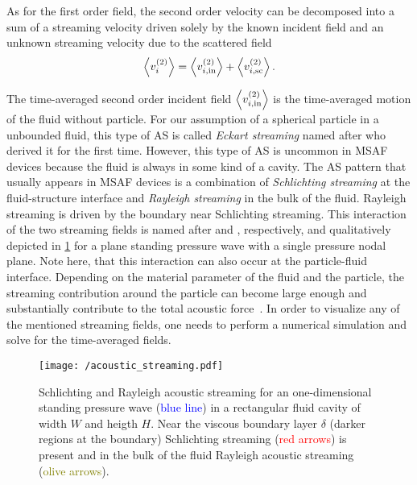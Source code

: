 As for the first order field, the second order velocity can be decomposed into 
a sum of a streaming velocity driven solely by the known incident field and an 
unknown streaming velocity due to the scattered field
\begin{equation}
  \left\langle v_{i}^{(2)} \right\rangle =
    \left\langle v_{i,\mathrm{in}}^{(2)} \right\rangle +
    \left\langle v_{i,\mathrm{sc}}^{(2)} \right\rangle.
  \label{eq:TA-nd-velocity}
\end{equation}

The time-averaged second order incident field 
$\left\langle v_{i,\mathrm{in}}^{(2)} \right\rangle$ is the time-averaged motion of the 
fluid without particle. For our assumption of a spherical particle in a 
unbounded fluid, this type of AS is called \emph{Eckart streaming} named after 
 who derived it for the first time. However, this type of AS 
is uncommon in MSAF devices because the fluid is always in some kind of a 
cavity. The AS pattern that usually appears in MSAF devices is a combination of 
\emph{Schlichting streaming} at the fluid-structure interface and 
\emph{Rayleigh streaming} in the bulk of the fluid. Rayleigh streaming is 
driven by the boundary near Schlichting streaming. This interaction of the two 
streaming fields is named after  and 
, respectively, and qualitatively depicted in 
\cref{fig:TA-acoustic_streaming} for a plane standing pressure wave with a 
single pressure nodal plane. Note here, that this interaction can also occur at 
the particle-fluid interface. Depending on the material parameter of the fluid 
and the particle, the streaming contribution around the particle can become 
large enough and substantially contribute to the total acoustic 
force~\cite{Baasch2019}.  In order to visualize any of the mentioned streaming 
fields, one needs to perform a numerical simulation and solve for the 
time-averaged fields.


\begin{figure}[tbp]
  \centering
  \texttt{[image: /acoustic\_streaming.pdf]}
  \caption{Schlichting and Rayleigh acoustic streaming for an one-dimensional 
    standing pressure wave (\textcolor{blue}{blue line}) in a rectangular fluid 
    cavity of width $W$ and heigth $H$. Near the viscous boundary layer 
    $\delta$ (darker regions at the boundary) Schlichting streaming 
    (\textcolor{red}{red arrows}) is present and in the bulk of the fluid 
  Rayleigh acoustic streaming (\textcolor{olive}{olive arrows}).}
  \label{fig:TA-acoustic_streaming}
\end{figure}

